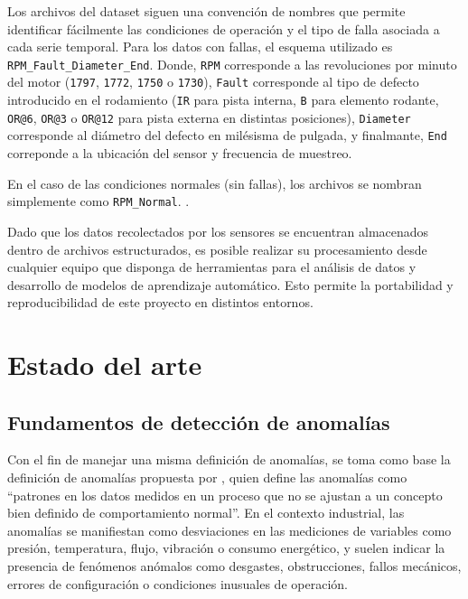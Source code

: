\documentclass[11pt,a4paper,spanish]{book}
\numberwithin{equation}{chapter}
\numberwithin{figure}{chapter}
\begin{document}
Los archivos del dataset siguen una convención de nombres que permite identificar 
fácilmente las condiciones de operación y el tipo de falla asociada a cada serie temporal.
Para los datos con fallas, el esquema utilizado es \texttt{RPM\_Fault\_Diameter\_End}.
Donde, \texttt{RPM} corresponde a las revoluciones por minuto del motor 
(\texttt{1797}, \texttt{1772}, \texttt{1750} o \texttt{1730}), \texttt{Fault} corresponde 
al tipo de defecto introducido en el rodamiento (\texttt{IR} para pista interna, 
\texttt{B} para elemento rodante, \texttt{OR@6}, \texttt{OR@3} o \texttt{OR@12} 
para pista externa en distintas posiciones), \texttt{Diameter} corresponde al 
diámetro del defecto en milésisma de pulgada, y finalmante, \texttt{End} correponde a
la ubicación del sensor y frecuencia de muestreo.


En el caso de las condiciones normales (sin fallas), los archivos se nombran simplemente 
como \texttt{RPM\_Normal}. 
\cite{rigas2024marine}.


Dado que los datos recolectados por los sensores se encuentran almacenados dentro de 
archivos estructurados, es posible realizar su procesamiento desde cualquier equipo 
que disponga de herramientas para el análisis de datos y desarrollo de modelos de 
aprendizaje automático. 
Esto permite la portabilidad y reproducibilidad de este proyecto en distintos entornos.


\section{Estado del arte}

\subsection{Fundamentos de detección de anomalías}

Con el fin de manejar una misma definición de anomalías, se toma como base la 
definición de anomalías propuesta por \cite{leon2012anomalias}, quien define las 
anomalías como “patrones en los datos medidos en un proceso que no se ajustan a un 
concepto bien definido de comportamiento normal”. 
En el contexto industrial, las anomalías se manifiestan como desviaciones en las 
mediciones de variables como presión, temperatura, flujo, vibración o consumo 
energético, y suelen indicar la presencia de fenómenos anómalos como desgastes, 
obstrucciones, fallos mecánicos, errores de configuración o condiciones inusuales 
de operación.
\end{document}
